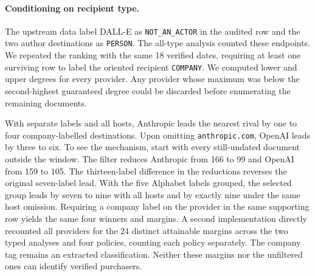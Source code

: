 \paragraph{Conditioning on recipient type.}
The upstream data label DALL-E as \texttt{NOT\_AN\_ACTOR} in the audited row and the two author destinations as \texttt{PERSON}. The all-type analysis counted these endpoints. We repeated the ranking with the same 18 verified dates, requiring at least one surviving row to label the oriented recipient \texttt{COMPANY}. We computed lower and upper degrees for every provider. Any provider whose maximum was below the second-highest guaranteed degree could be discarded before enumerating the remaining documents.

With separate labels and all hosts, Anthropic leads the nearest rival by one to four company-labelled destinations. Upon omitting \texttt{anthropic.com}, OpenAI leads by three to six. To see the mechanism, start with every still-undated document outside the window. The filter reduces Anthropic from 166 to 99 and OpenAI from 159 to 105. The thirteen-label difference in the reductions reverses the original seven-label lead. With the five Alphabet labels grouped, the selected group leads by seven to nine with all hosts and by exactly nine under the same host omission. Requiring a company label on the provider in the same supporting row yields the same four winners and margins. A second implementation directly recounted all providers for the 24 distinct attainable margins across the two typed analyses and four policies, counting each policy separately. The company tag remains an extracted classification. Neither these margins nor the unfiltered ones can identify verified purchasers.
